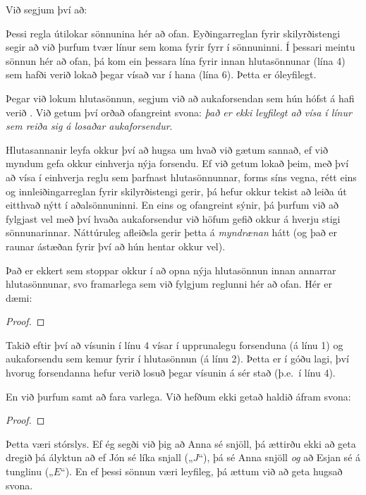 Við segjum því að:


Þessi regla útilokar sönnunina hér að ofan. Eyðingarreglan fyrir skilyrðistengi segir að við þurfum tvær línur sem koma fyrir fyrr í sönnuninni. Í þessari meintu sönnun hér að ofan, þá kom ein þessara lína fyrir innan hlutasönnunar (lína 4) sem hafði verið lokað þegar vísað var í hana (lína 6). Þetta er óleyfilegt.

Þegar við lokum hlutasönnun, segjum við að aukaforsendan sem hún hófst á hafi verið . Við getum því orðað ofangreint svona: \emph{það er ekki leyfilegt að vísa í línur sem reiða sig á losaðar aukaforsendur}. 

Hlutasannanir leyfa okkur því að hugsa um hvað við gætum sannað, ef við myndum gefa okkur einhverja nýja forsendu. Ef við getum lokað þeim, með því að vísa í einhverja reglu sem þarfnast hlutasönnunnar, forms síns vegna, rétt eins og innleiðingarreglan fyrir skilyrðistengi gerir, þá hefur okkur tekist að leiða út eitthvað nýtt í aðalsönnuninni. En eins og ofangreint sýnir, þá þurfum við að fylgjast vel með því hvaða aukaforsendur við höfum gefið okkur á hverju stigi sönnunarinnar. Náttúruleg afleiðsla gerir þetta á \emph{myndrænan} hátt (og það er raunar ástæðan fyrir því að hún hentar okkur vel).

Það er ekkert sem stoppar okkur í að opna nýja hlutasönnun innan annarrar hlutasönnunar, svo framarlega sem við fylgjum reglunni hér að ofan. Hér er dæmi:
\begin{proof}
\open
	\open
	\close
\close
{}
\end{proof}
Takið eftir því að vísunin í línu 4 vísar í upprunalegu forsenduna (á línu 1) og aukaforsendu sem kemur fyrir í hlutasönnun (á línu 2). Þetta er í góðu lagi, því hvorug forsendanna hefur verið losuð þegar vísunin á sér stað (þ.e.\ í línu 4).

En við þurfum samt að fara varlega. Við hefðum ekki getað haldið áfram svona:
\begin{proof}
\open
	\open
	\close
\close
{}
\end{proof}
Þetta væri stórslys. Ef ég segði við þig að Anna sé snjöll, þá ættirðu ekki að geta dregið þá ályktun að ef Jón sé líka snjall („$J$“), þá sé Anna snjöll \emph{og} að Esjan sé á tunglinu („$E$“). En ef þessi sönnun væri leyfileg, þá ættum við að geta hugsað svona.

